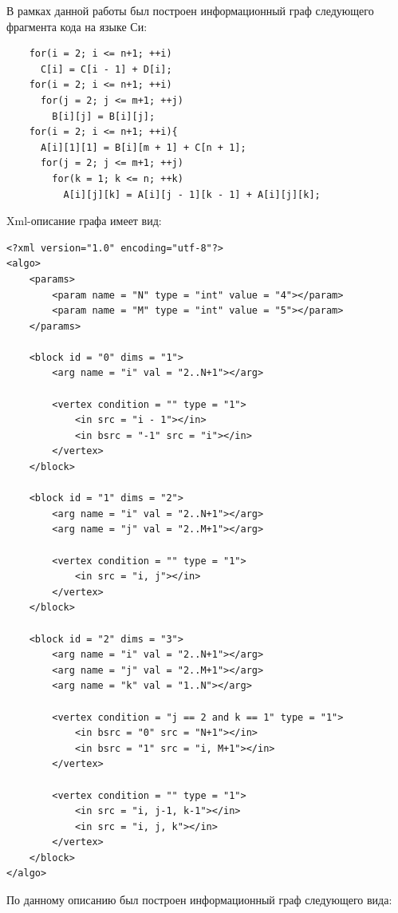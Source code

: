 \documentclass[a4paper, 12pt]{article}
\begin{document}
	В рамках данной работы был построен информационный граф следующего фрагмента кода на языке Си:
	
	\lstset{language=C}
	\begin{lstlisting}
	for(i = 2; i <= n+1; ++i)
	  C[i] = C[i - 1] + D[i];
	for(i = 2; i <= n+1; ++i)
	  for(j = 2; j <= m+1; ++j)
	    B[i][j] = B[i][j];
	for(i = 2; i <= n+1; ++i){
	  A[i][1][1] = B[i][m + 1] + C[n + 1];
	  for(j = 2; j <= m+1; ++j)
	    for(k = 1; k <= n; ++k)
	      A[i][j][k] = A[i][j - 1][k - 1] + A[i][j][k];
	\end{lstlisting}
	
	Xml-описание графа имеет вид:
	
	\lstset{language=xml}
	\begin{lstlisting}
<?xml version="1.0" encoding="utf-8"?>
<algo>
    <params>
        <param name = "N" type = "int" value = "4"></param>
        <param name = "M" type = "int" value = "5"></param>
    </params>

    <block id = "0" dims = "1">
        <arg name = "i" val = "2..N+1"></arg>

        <vertex condition = "" type = "1">
            <in src = "i - 1"></in>
            <in bsrc = "-1" src = "i"></in>
        </vertex>
    </block>

    <block id = "1" dims = "2">
        <arg name = "i" val = "2..N+1"></arg>
        <arg name = "j" val = "2..M+1"></arg>

        <vertex condition = "" type = "1">
            <in src = "i, j"></in>
        </vertex>
    </block>

    <block id = "2" dims = "3">
        <arg name = "i" val = "2..N+1"></arg>
        <arg name = "j" val = "2..M+1"></arg>
        <arg name = "k" val = "1..N"></arg>

        <vertex condition = "j == 2 and k == 1" type = "1">
            <in bsrc = "0" src = "N+1"></in>
            <in bsrc = "1" src = "i, M+1"></in>
        </vertex>

        <vertex condition = "" type = "1">
            <in src = "i, j-1, k-1"></in>
            <in src = "i, j, k"></in>
        </vertex>
    </block>
</algo>
	\end{lstlisting}
	
	По данному описанию был построен информационный граф следующего вида:
	
\end{document}
